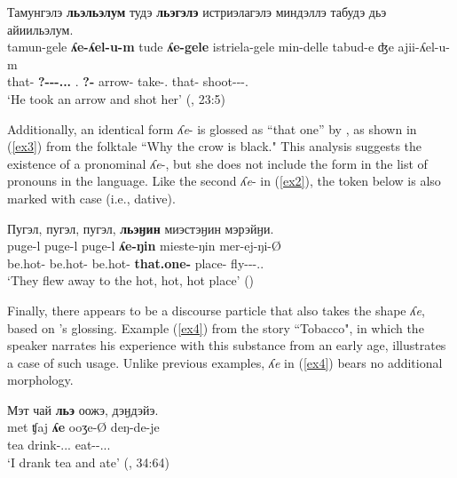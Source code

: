 \documentclass[output=paper,colorlinks,citecolor=brown
\ChapterDOI{10.5281/zenodo.15697581}
]{langscibook}
\begin{document}
\ea \label{ex2}
    \glll Тамунгэлэ \textbf{льэльэлум} тудэ \textbf{льэгэлэ} истриэлагэлэ миндэллэ табудэ дьэ айиильэлум. \\
    tamun-gele \textbf{ʎe-ʎel-u-m} tude \textbf{ʎe-gele} istriela-gele min-delle tabud-e ʤe ajii-ʎel-u-m \\
    that-\Acc{} \textbf{\Cop?-\Ev-\Ep-\Ass.\Tr.\Ef.\Tsg{}} \Tsg.\Gen{} \textbf{\Cop?-\Acc{}} arrow-\Acc{} take-\Cvb.\Seq{} that-\Ins{} \Dp{} shoot-\Ev-\Ep-\Ass.\Tsg{}  \\
    \glt `He took an arrow and shot her' \hfill (\citealt{Nikolaeva_Mayer2004}, 23:5)
\z


Additionally, an identical form \textit{ʎe}- is glossed as ``that one'' by \citet{Nagasaki2010}, as shown in (\ref{ex3}) from the folktale ``Why the crow is black." 
This analysis suggests the existence of a pronominal \textit{ʎe}-, but she does not include the form in the list of pronouns  in the language.
Like the second \textit{ʎe}- in (\ref{ex2}), the token below is also marked with case (i.e., dative). 

\ea \label{ex3}
    \glll Пугэл, пугэл, пугэл, \textbf{льэӈин} миэстэӈин мэрэйӈи. \\
    puge-l puge-l puge-l \textbf{ʎe-ŋin} mieste-ŋin mer-ej-ŋi-Ø  \\
    be.hot-\Ptcp{} be.hot-\Ptcp{} be.hot-\Ptcp{} \textbf{that.one-\Dat{}} place-\Dat{} fly-\Pfv-\Third\Pl-\Ass.\Intr.\Ef \\
    \glt `They flew away to the hot, hot, hot place' \hfill (\citealt[252]{Nagasaki2010})
\z

Finally, there appears to be a discourse particle that also takes the shape \textit{ʎe}, based on \citet{Nikolaeva_Mayer2004}'s glossing. 
Example (\ref{ex4}) from the story ``Tobacco", in which the speaker narrates his experience with this substance from an early age, illustrates a case of such usage.
Unlike previous examples, \textit{ʎe} in (\ref{ex4}) bears no additional morphology. 


\ea \label{ex4}
    \glll Мэт чай \textbf{льэ} оожэ, дэӈдэйэ. \\
    met ʧaj \textbf{ʎe} ooʒe-Ø deŋ-de-je  \\
    \Fsg{} tea \textbf{\Dp{}} drink-\Ass.\Tr.\Ef.\Fsg{} eat-\Unk-\Ass.\Intr.\Ef.\Fsg{} \\
    \glt `I drank tea and ate' \hfill (\citealt{Nikolaeva_Mayer2004}, 34:64)
\z
\end{document}

